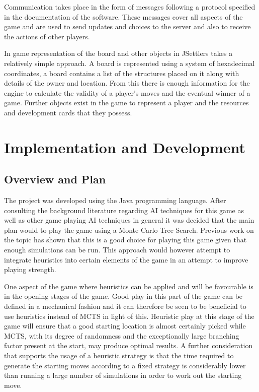 \documentclass[]{article}
\let\oldsection\section
\renewcommand\section{\clearpage\oldsection}
\begin{document}
\par Communication takes place in the form of messages following a protocol specified in the documentation of the software. These messages cover all aspects of the game and are used to send updates and choices to the server and also to receive the actions of other players.

\par In game representation of the board and other objects in JSettlers takes a relatively simple approach. A board is represented using a system of hexadecimal coordinates, a board contains a list of the structures placed on it along with details of the owner and location. From this there is enough information for the engine to calculate the validity of a player's moves and the eventual winner of a game. Further objects exist in the game to represent a player and the resources and development cards that they possess. 


\section{Implementation and Development}

\subsection{Overview and Plan}
The project was developed using the Java programming language. After consulting the background literature regarding AI techniques for this game as well as other game playing AI techniques in general it was decided that the main plan would to play the game using a Monte Carlo Tree Search. Previous work on the topic has shown that this is a good choice for playing this game given that enough simulations can be run. This approach would however attempt to integrate heuristics into certain elements of the game in an attempt to improve playing strength. 

\par One aspect of the game where heuristics can be applied and will be favourable is in the opening stages of the game. Good play in this part of the game can be defined in a mechanical fashion and it can therefore be seen to be beneficial to use heuristics instead of MCTS in light of this. Heuristic play at this stage of the game will ensure that a good starting location is almost certainly picked while MCTS, with its degree of randomness and the exceptionally large branching factor present at the start, may produce optimal results. A further consideration that supports the usage of a heuristic strategy is that the time required to generate the starting moves according to a fixed strategy is considerably lower than running a large number of simulations in order to work out the starting move.
\end{document}
